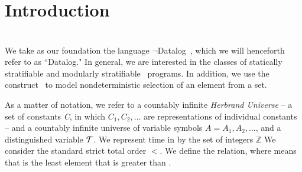 \section{Introduction}







\section{\large \bf \slang}
We take as our foundation the language $\lnot$Datalog~\cite{ullmanbook}, which
we will henceforth refer to as ``Datalog." In general, we are interested in the
classes of statically stratifiable 
and modularly stratifiable~\cite{modular} programs.  In addition, we use
the  construct~\cite{greedychoice, eventchoice} to model
nondeterministic selection of an element from a set.  

As a matter of notation, we refer to a countably infinite {\em Herbrand
Universe} -- a set of constants \emph{C}, in which $C_{1}, C_{2}, \ldots$ are
representations of individual constants -- and a countably infinite universe of
variable symbols $A = A_1, A_2, \ldots$, and a distinguished variable $\Tau$.
We represent time in \slang by the set of integers $\mathbb{Z}$ We consider the
standard strict total order $<$. We define the  relation,
where  means that  is the least element that
is greater than .


